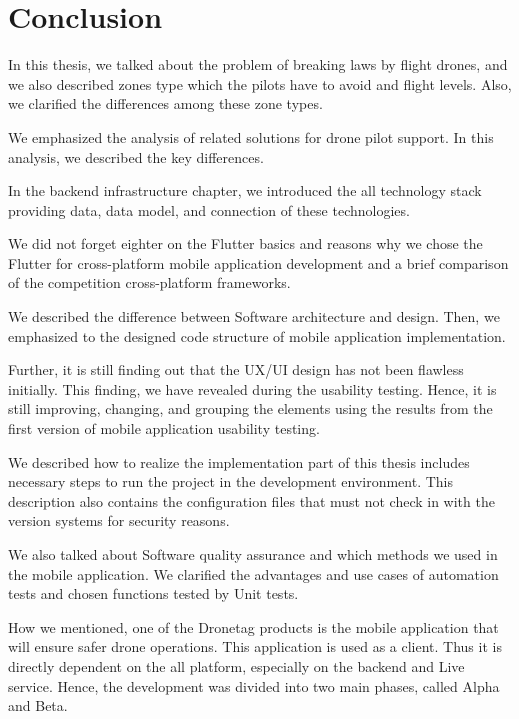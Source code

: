 \chapter{Conclusion}\label{ch:conclusion}
In this thesis, we talked about the problem of breaking laws by flight drones, and we also described zones type which the pilots have to avoid and flight levels.
Also, we clarified the differences among these zone types.

We emphasized the analysis of related solutions for drone pilot support.
In this analysis, we described the key differences.

In the backend infrastructure chapter, we introduced the all technology stack providing data, data model, and connection of these technologies.

We did not forget eighter on the Flutter basics and reasons why we chose the Flutter for cross-platform mobile application development and a brief comparison of the competition cross-platform frameworks.

We described the difference between Software architecture and design.
Then, we emphasized to the designed code structure of mobile application implementation.

Further, it is still finding out that the UX/UI design has not been flawless initially.
This finding, we have revealed during the usability testing.
Hence, it is still improving, changing, and grouping the elements using the results from the first version of mobile application usability testing.

We described how to realize the implementation part of this thesis includes necessary steps to run the project in the development environment.
This description also contains the configuration files that must not check in with the version systems for security reasons.

We also talked about Software quality assurance and which methods we used in the mobile application.
We clarified the advantages and use cases of automation tests and chosen functions tested by Unit tests.

How we mentioned, one of the Dronetag products is the mobile application that will ensure safer drone operations.
This application is used as a client.
Thus it is directly dependent on the all platform, especially on the backend and Live service.
Hence, the development was divided into two main phases, called Alpha and Beta.

